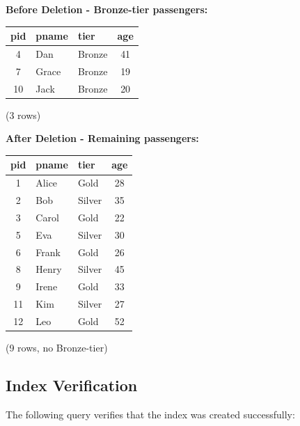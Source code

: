 \documentclass[12pt]{article}
\begin{document}
\noindent
\begin{minipage}[t]{0.48\textwidth}
\centering
{\small
\textbf{Before Deletion - Bronze-tier passengers:}

\vspace{0.2cm}

\begin{tabular}{|c|l|l|c|}
\hline
\textbf{pid} & \textbf{pname} & \textbf{tier} & \textbf{age} \\
\hline
4 & Dan & Bronze & 41 \\
7 & Grace & Bronze & 19 \\
10 & Jack & Bronze & 20 \\
\hline
\end{tabular}

\vspace{0.1cm}

(3 rows)
}
\end{minipage}
\hfill
\begin{minipage}[t]{0.48\textwidth}
\centering
{\small
\textbf{After Deletion - Remaining passengers:}

\vspace{0.2cm}

\begin{tabular}{|c|l|l|c|}
\hline
\textbf{pid} & \textbf{pname} & \textbf{tier} & \textbf{age} \\
\hline
1 & Alice & Gold & 28 \\
2 & Bob & Silver & 35 \\
3 & Carol & Gold & 22 \\
5 & Eva & Silver & 30 \\
6 & Frank & Gold & 26 \\
8 & Henry & Silver & 45 \\
9 & Irene & Gold & 33 \\
11 & Kim & Silver & 27 \\
12 & Leo & Gold & 52 \\
\hline
\end{tabular}

\vspace{0.1cm}

(9 rows, no Bronze-tier)
}
\end{minipage}

\newpage
\subsection{Index Verification}

The following query verifies that the index was created successfully:
\end{document}
